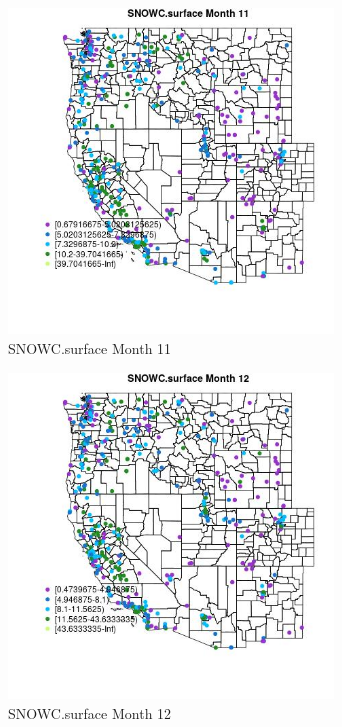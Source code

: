 \begin{figure} 
\centering  
\includegraphics[width=0.77\textwidth]{Code_Outputs/ML_input_report_ML_input_PM25_Step5_part_d_de_duplicated_aves_ML_input_MapObsMo11SNOWCsurface.jpg} 
\caption{\label{fig:ML_input_report_ML_input_PM25_Step5_part_d_de_duplicated_aves_ML_inputMapObsMo11SNOWCsurface}SNOWC.surface Month 11} 
\end{figure} 
 

\begin{figure} 
\centering  
\includegraphics[width=0.77\textwidth]{Code_Outputs/ML_input_report_ML_input_PM25_Step5_part_d_de_duplicated_aves_ML_input_MapObsMo12SNOWCsurface.jpg} 
\caption{\label{fig:ML_input_report_ML_input_PM25_Step5_part_d_de_duplicated_aves_ML_inputMapObsMo12SNOWCsurface}SNOWC.surface Month 12} 
\end{figure} 
 

